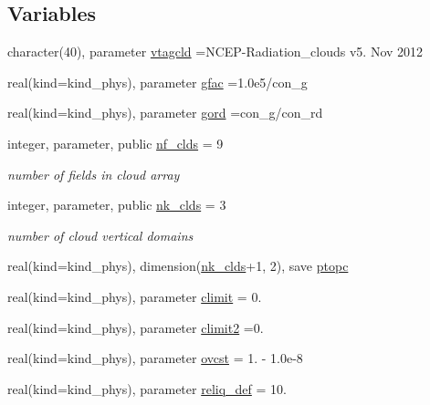 \subsection*{Variables}
\begin{DoxyCompactItemize}
\item 
character(40), parameter \hyperlink{namespacemodule__radiation__clouds_a54f11c2f6353f244501cf4ec3553d78b}{vtagcld} =\textquotesingle{}N\+C\+EP-\/Radiation\+\_\+clouds v5. Nov 2012 \textquotesingle{}
\item 
real(kind=kind\+\_\+phys), parameter \hyperlink{group__module__radiation__clouds_gab4060544be25be2b0a87042fb3bd6242}{gfac} =1.\+0e5/con\+\_\+g
\item 
real(kind=kind\+\_\+phys), parameter \hyperlink{group__module__radiation__clouds_ga50ea21222eb91e6363e8bf1338b34a66}{gord} =con\+\_\+g/con\+\_\+rd
\item 
integer, parameter, public \hyperlink{group__module__radiation__clouds_ga66cf0f94619a3d865b0c593197a30576}{nf\+\_\+clds} = 9
\begin{DoxyCompactList}\small\item\em number of fields in cloud array \end{DoxyCompactList}\item 
integer, parameter, public \hyperlink{group__module__radiation__clouds_ga2739168b8205ee860eb8a160ea722a44}{nk\+\_\+clds} = 3
\begin{DoxyCompactList}\small\item\em number of cloud vertical domains \end{DoxyCompactList}\item 
real(kind=kind\+\_\+phys), dimension(\hyperlink{group__module__radiation__clouds_ga2739168b8205ee860eb8a160ea722a44}{nk\+\_\+clds}+1, 2), save \hyperlink{group__module__radiation__clouds_ga03bc5d19cbdc84a2032c8d591ba4c96a}{ptopc}
\item 
real(kind=kind\+\_\+phys), parameter \hyperlink{group__module__radiation__clouds_gad4d5840310847f5bf39082114069ceb8}{climit} = 0.
\item 
real(kind=kind\+\_\+phys), parameter \hyperlink{group__module__radiation__clouds_ga2f6f333d39f496f623036802fc05f209}{climit2} =0.
\item 
real(kind=kind\+\_\+phys), parameter \hyperlink{group__module__radiation__clouds_ga5667082e13ef37593bdfcc152e3dd449}{ovcst} = 1. -\/ 1.\+0e-\/8
\item 
real(kind=kind\+\_\+phys), parameter \hyperlink{group__module__radiation__clouds_ga1768a85f4d8af2ad40b62ae6e6667c1e}{reliq\+\_\+def} = 10.

\end{DoxyCompactItemize}
